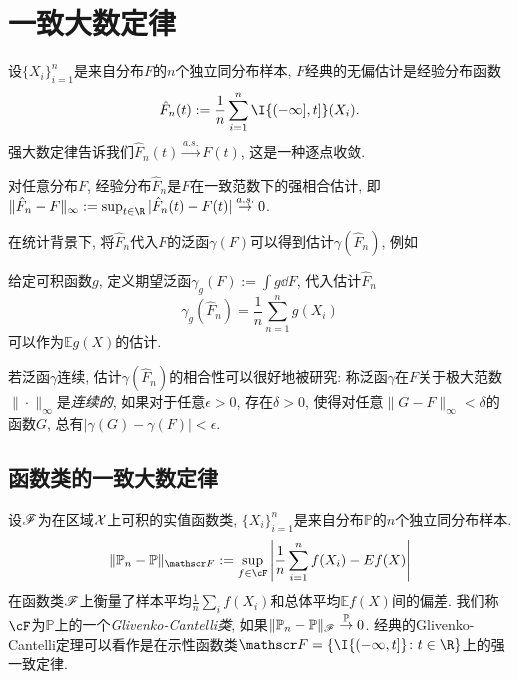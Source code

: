 \section{一致大数定律}

设$\{X_i\}_{i=1}^n$是来自分布$F$的$n$个独立同分布样本, $F$经典的无偏估计是经验分布函数
\begin{equation*}
	\hat F_n(t) := \frac{1}{n} \sum_{i=1}^n \I{(-\infty], t]}(X_i). 
\end{equation*}
强大数定律告诉我们$\hat F_n(t) \stackrel{a.s.}{\to} F(t)$, 这是一种逐点收敛. 

\begin{theorem}\label{thm:Glivenko-Cantelli}
		对任意分布$F$, 经验分布$\hat F_n$是$F$在一致范数下的强相合估计, 即$\|\hat F_n - F\|_{\infty} := \sup_{t \in \R} |\hat F_n(t) - F(t)| \stackrel{a.s.}{\to} 0$. 
\end{theorem}

在统计背景下,  将$\hat F_n$代入$F$的泛函$\gamma(F)$可以得到估计$\gamma(\hat F_n)$, 例如

\begin{example}
	给定可积函数$g$, 定义期望泛函$\gamma_g(F) := \int g \dd F$, 代入估计$\hat F_n$
	\begin{equation*}
		\gamma_g(\hat F_n) = \frac{1}{n} \sum_{n=1}^n g(X_i)
	\end{equation*}
	可以作为$\mathbb{E} g(X)$的估计. 
\end{example}

若泛函$\gamma$连续, 估计$\gamma(\hat F_n)$的相合性可以很好地被研究: 称泛函$\gamma$在$F$关于极大范数$\| \cdot \|_{\infty}$是\emph{连续的}, 如果对于任意$\epsilon > 0$, 存在$\delta > 0$, 使得对任意$\|G - F\|_{\infty} < \delta$的函数$G$, 总有$|\gamma(G) - \gamma(F)| < \epsilon$. 

\subsection{函数类的一致大数定律}

设$\mathscr{F}$为在区域$\mathcal{X}$上可积的实值函数类, $\{X_i\}_{i=1}^n$是来自分布$\mathbb{P}$的$n$个独立同分布样本. 
\begin{equation*}
	\|\mathbb{P}_n - \mathbb{P}\|_{\sF} := \sup_{f \in\cF} \left| \frac{1}{n} \sum_{i=1}^n f(X_i) - E f(X) \right|
\end{equation*}
在函数类$\mathscr{F}$上衡量了样本平均$\frac{1}{n} \sum_i f(X_i)$和总体平均$\mathbb{E} f(X)$间的偏差. 
我们称$\cF$为$\mathbb{P}$上的一个\emph{Glivenko-Cantelli类}, 如果$\|\mathbb{P}_n - \mathbb{P}\|_{\mathscr{F}} \stackrel{\mathbb{P}}{\to} 0$. 
经典的Glivenko-Cantelli定理可以看作是在示性函数类$\sF = \{\I{(- \infty, t]} \colon t \in \R \}$上的强一致定律. 


